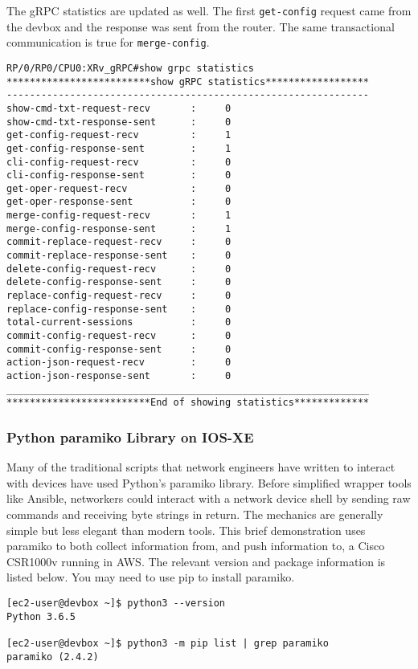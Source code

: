 The gRPC statistics are updated as well. The first \verb|get-config| request came
from the devbox and the response was sent from the router. The same
transactional communication is true for \verb|merge-config|.

\begin{verbatim}
RP/0/RP0/CPU0:XRv_gRPC#show grpc statistics 
*************************show gRPC statistics******************
---------------------------------------------------------------
show-cmd-txt-request-recv       :     0
show-cmd-txt-response-sent      :     0
get-config-request-recv         :     1
get-config-response-sent        :     1
cli-config-request-recv         :     0
cli-config-response-sent        :     0
get-oper-request-recv           :     0
get-oper-response-sent          :     0
merge-config-request-recv       :     1
merge-config-response-sent      :     1
commit-replace-request-recv     :     0
commit-replace-response-sent    :     0
delete-config-request-recv      :     0
delete-config-response-sent     :     0
replace-config-request-recv     :     0
replace-config-response-sent    :     0
total-current-sessions          :     0
commit-config-request-recv      :     0
commit-config-response-sent     :     0
action-json-request-recv        :     0
action-json-response-sent       :     0
_______________________________________________________________
*************************End of showing statistics*************
\end{verbatim}

\subsubsection{Python paramiko Library on IOS-XE}
Many of the traditional scripts that network engineers have written to
interact with devices have used Python's paramiko library. Before simplified
wrapper tools like Ansible, networkers could interact with a network device
shell by sending raw commands and receiving byte strings in return. The
mechanics are generally simple but less elegant than modern tools. This brief
demonstration uses paramiko to both collect information from, and push
information to, a Cisco CSR1000v running in AWS\@. The relevant version and
package information is listed below. You may need to use pip to install paramiko.

\begin{verbatim}
[ec2-user@devbox ~]$ python3 --version
Python 3.6.5

[ec2-user@devbox ~]$ python3 -m pip list | grep paramiko
paramiko (2.4.2)
\end{verbatim}

